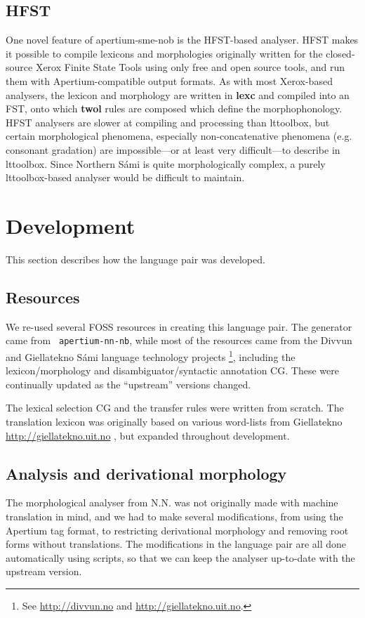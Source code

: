 \subsection{HFST}
\label{sec:hfst}
One novel feature of apertium-sme-nob is the HFST-based analyser. HFST
makes it possible to compile lexicons and morphologies originally
written for the closed-source Xerox Finite State Tools using only free
and open source tools, and run them with Apertium-compatible output
formats. As with most Xerox-based analysers, the \sme{} lexicon and
morphology are written in \textbf{lexc} and compiled into an FST, onto
which \textbf{twol} rules are composed which define the
morphophonology. HFST analysers are slower at compiling and processing
than lttoolbox, but certain morphological phenomena, especially
non-concatenative phenomena (e.g. \sme{} consonant gradation) are
impossible---or at least very difficult---to describe in lttoolbox.
Since Northern Sámi is quite morphologically complex, a purely
lttoolbox-based analyser would be difficult to maintain.


\section{Development}
  \label{sec:development}

This section describes how the language pair was developed.
\subsection{Resources}
We re-used several FOSS resources in creating this language pair. The
\nob{} generator came from {\tt
  apertium-nn-nb}\citep{unhammer2009rfr}, while most of the \sme{}
resources came from the Divvun and Giellatekno Sámi language
technology projects \footnote{See
  \href{http://divvun.no}{http://divvun.no} and
  \href{http://giellatekno.uit.no}{http://giellatekno.uit.no}.},
including the lexicon/morphology and disambiguator/syntactic
annotation CG. These were continually updated as the ``upstream''
versions changed.

The lexical selection CG and the transfer rules were written from
scratch. The translation lexicon was originally based on various
word-lists from Giellatekno
\href{http://giellatekno.uit.no}{http://giellatekno.uit.no}
, but expanded throughout
development.
\subsection{Analysis and derivational morphology}
The morphological analyser from N.N. was not
originally made with machine translation in mind, and we had to make
several modifications, from using the Apertium tag format, to
restricting derivational morphology and removing root forms without
translations. The modifications in the language pair are all done
automatically using scripts, so that we can keep the analyser
up-to-date with the upstream version.

